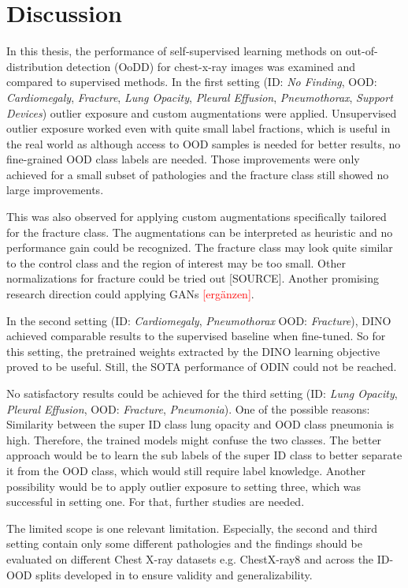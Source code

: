 \section{Discussion}
In this thesis, the performance of self-supervised learning methods on out-of-distribution detection (OoDD) for chest-x-ray images was examined and compared to supervised methods.
In the first setting (ID: \textit{No Finding}, OOD: \textit{Cardiomegaly}, \textit{Fracture}, \textit{Lung Opacity}, \textit{Pleural Effusion}, \textit{Pneumothorax}, \textit{Support Devices}) outlier exposure and custom augmentations were applied.
Unsupervised outlier exposure worked even with quite small label fractions, which is useful in the real world as although access to OOD samples is needed for better results, no fine-grained OOD class labels are needed.
Those improvements were only achieved for a small subset of pathologies and the fracture class still showed no large improvements.
\par
This was also observed for applying custom augmentations specifically tailored for the fracture class.
The augmentations can be interpreted as heuristic and no performance gain could be recognized.
The fracture class may look quite similar to the control class and the region of interest may be too small. 
Other normalizations for fracture could be tried out [SOURCE].
Another promising research direction could applying GANs \textcolor{red}{[ergänzen]}.
\par 
In the second setting (ID: \textit{Cardiomegaly}, \textit{Pneumothorax} OOD: \textit{Fracture}), DINO achieved comparable results to the supervised baseline when fine-tuned.
So for this setting, the pretrained weights extracted by the DINO learning objective proved to be useful.
Still, the SOTA performance of ODIN could not be reached.
\par
No satisfactory results could be achieved for the third setting (ID: \textit{Lung Opacity}, \textit{Pleural Effusion}, OOD: \textit{Fracture}, \textit{Pneumonia}).
One of the possible reasons: Similarity between the super ID class lung opacity and OOD class pneumonia is high. 
Therefore, the trained models might confuse the two classes. 
The better approach would be to learn the sub labels of the super ID class to better separate it from the OOD class, which would still require label knowledge. 
Another possibility would be to apply outlier exposure to setting three, which was successful in setting one. 
For that, further studies are needed. 
\par
The limited scope is one relevant limitation. Especially, the second and third setting contain only some different pathologies and the findings should be evaluated on different Chest X-ray datasets e.g. ChestX-ray8 \citep{Wang2017} and across the ID-OOD splits developed in \citep{Cao2020} to ensure validity and generalizability.
